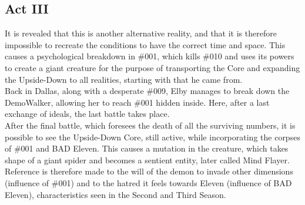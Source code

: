 \subsection{Act III}
It is revealed that this is another alternative reality, and that it is therefore impossible to recreate the conditions to have the correct time and space. This causes a psychological breakdown in \#001, which kills \#010 and uses its powers to create a giant creature for the purpose of transporting the Core and expanding the Upside-Down to all realities, starting with that he came from.\\
Back in Dallas, along with a desperate \#009, Elby manages to break down the DemoWalker, allowing her to reach \#001 hidden inside. Here, after a last exchange of ideals, the last battle takes place.\\
After the final battle, which foresees the death of all the surviving numbers, it is possible to see the Upside-Down Core, still active, while incorporating the corpses of \#001 and BAD Eleven. This causes a mutation in the creature, which takes shape of a giant spider and becomes a sentient entity, later called Mind Flayer. Reference is therefore made to the will of the demon to invade other dimensions (influence of \#001) and to the hatred it feels towards Eleven (influence of BAD Eleven), characteristics seen in the Second and Third Season.